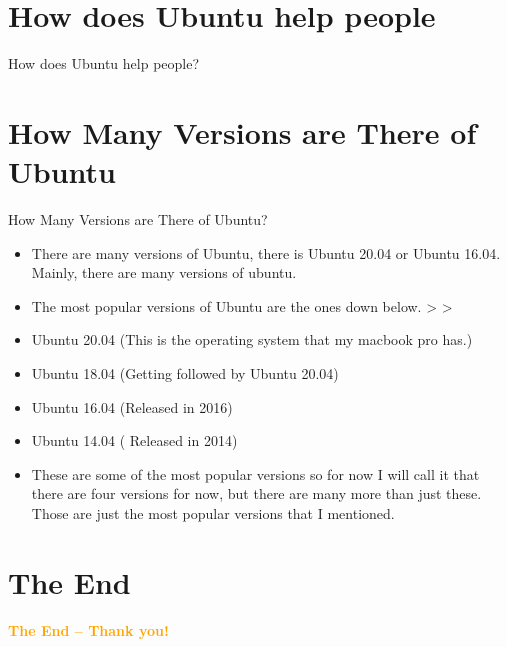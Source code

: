 \documentclass[aspectratio=43]{beamer}
\begin{document}
	
	\section{How does Ubuntu help people}
\begin{frame}{How does Ubuntu help people?}

\end{frame}	



\section{How Many Versions are There of Ubuntu}
\begin{frame}{How Many Versions are There of Ubuntu?}
\begin{itemize}
\item There are many versions of Ubuntu, there is Ubuntu 20.04 or Ubuntu 16.04. Mainly, there are many versions of ubuntu.
\item The most popular versions of Ubuntu are the ones down below.
>
>
\item Ubuntu 20.04 (This is the operating system that my macbook pro has.)
\item Ubuntu 18.04 (Getting followed by Ubuntu 20.04)
\item Ubuntu 16.04 (Released in 2016)
\item Ubuntu 14.04 ( Released in 2014)
\item These are some of the most popular versions so for now I will call it that there are four versions for now, but there are many more than just these. Those are just the most popular versions that I mentioned. 
\end{itemize}

 


\end{frame}


	
\section{The End}
    \begin{frame}{ }
        \centering
            \Huge\bfseries
        \textcolor{orange}{The End -- Thank you!}
    \end{frame}
\end{document}
